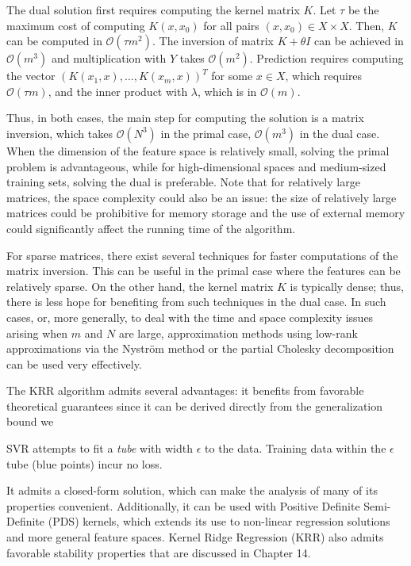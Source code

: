 \documentclass[fleqn,10pt]{olplainarticle}
\begin{document}
The dual solution first requires computing the kernel matrix \(K\). Let \(\tau\) be the maximum cost of computing \(K(x, x_0)\) for all pairs \((x, x_0) \in X \times X\). Then, \(K\) can be computed in \(\mathcal{O}(\tau m^2)\). The inversion of matrix \(K + \theta I\) can be achieved in \(\mathcal{O}(m^3)\) and multiplication with \(Y\) takes \(\mathcal{O}(m^2)\). Prediction requires computing the vector \((K(x_1, x), \ldots, K(x_m, x))^T\) for some \(x \in X\), which requires \(\mathcal{O}(\tau m)\), and the inner product with \(\lambda\), which is in \(\mathcal{O}(m)\).

Thus, in both cases, the main step for computing the solution is a matrix inversion, which takes \(\mathcal{O}(N^3)\) in the primal case, \(\mathcal{O}(m^3)\) in the dual case. When the dimension of the feature space is relatively small, solving the primal problem is advantageous, while for high-dimensional spaces and medium-sized training sets, solving the dual is preferable. Note that for relatively large matrices, the space complexity could also be an issue: the size of relatively large matrices could be prohibitive for memory storage and the use of external memory could significantly affect the running time of the algorithm.

For sparse matrices, there exist several techniques for faster computations of the matrix inversion. This can be useful in the primal case where the features can be relatively sparse. On the other hand, the kernel matrix \(K\) is typically dense; thus, there is less hope for benefiting from such techniques in the dual case. In such cases, or, more generally, to deal with the time and space complexity issues arising when \(m\) and \(N\) are large, approximation methods using low-rank approximations via the Nyström method or the partial Cholesky decomposition can be used very effectively.

The KRR algorithm admits several advantages: it benefits from favorable theoretical guarantees since it can be derived directly from the generalization bound we

SVR attempts to fit a \emph{tube} with width $\epsilon$ to the data. Training data within the $\epsilon$ tube (blue points) incur no loss.

It admits a closed-form solution, which can make the analysis of many of its properties convenient. Additionally, it can be used with Positive Definite Semi-Definite (PDS) kernels, which extends its use to non-linear regression solutions and more general feature spaces. Kernel Ridge Regression (KRR) also admits favorable stability properties that are discussed in Chapter 14.
\end{document}
